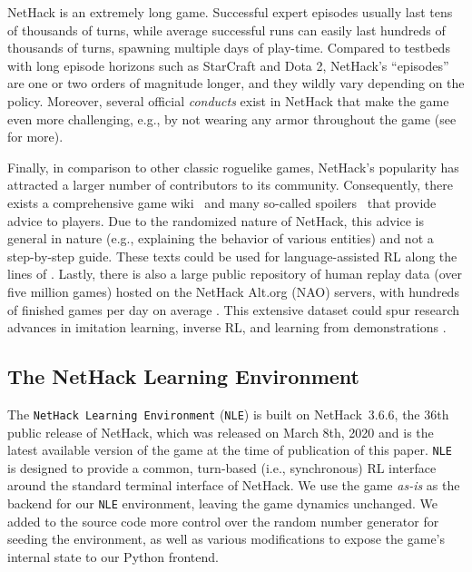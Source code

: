 \documentclass{article}
\newcommand{\nethackenv}{\texttt{NetHack Learning Environment}}
\newcommand{\NLE}{\texttt{NLE}}
\begin{document}
NetHack is an extremely long game. Successful expert episodes usually last
tens of thousands of turns, while average successful runs can easily
last hundreds of thousands of turns, spawning multiple days of
play-time. Compared to testbeds with long episode horizons such as
StarCraft and Dota 2, NetHack's ``episodes'' are one or two orders of
magnitude longer, and they wildly vary depending on the policy.
Moreover, several official \emph{conducts} exist in NetHack that make the game even more challenging, e.g., by not wearing any armor throughout the game (see  for more).

Finally, in comparison to other classic roguelike games, NetHack's
popularity has attracted a larger number of contributors to its
community.  Consequently, there exists a comprehensive game wiki~\citep{nhwiki} and many so-called spoilers~\citep{NetHackSpoilers} that provide advice to players. Due to the randomized nature of NetHack, this advice is general in nature  (e.g., explaining the behavior of various entities) and not a step-by-step guide.
These texts could be used for language-assisted RL along the lines of \citep{Zhong2019RTFMGT}. Lastly, there is also a large public repository of human replay data (over five million games) hosted on the
NetHack Alt.org (NAO)
servers, with hundreds of finished games per day on average \citep{AltOrgNethack}.
This extensive
dataset could spur research advances in imitation learning, inverse
RL, and learning from demonstrations
\citep{Abbeel2004ApprenticeshipLV, Argall2009ASO}.


\subsection{The NetHack Learning Environment}
\label{sec:nle}

The \nethackenv{} (\NLE{}) is built on NetHack~3.6.6, the 36th public
release of NetHack, which was released on March 8th, 2020 and is the
latest available version of the game at the time of publication of
this paper.
\NLE{} is designed to provide a common,
turn-based (i.e., synchronous) RL interface around
the standard terminal interface of NetHack.  We use the game
\emph{as-is} as the backend for our \NLE{} environment, leaving the game dynamics unchanged. We added to the source code more
control over the random number generator for seeding the environment,
as well as various modifications to expose the game's internal state
to our Python frontend.
\end{document}
